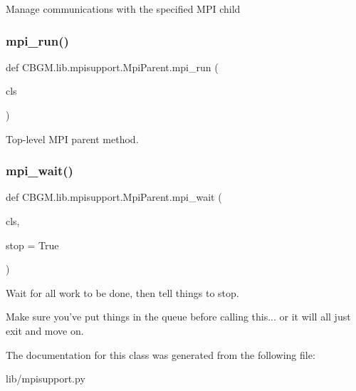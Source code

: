 \begin{DoxyVerb}Manage communications with the specified MPI child
\end{DoxyVerb}
 \mbox{\label{classCBGM_1_1lib_1_1mpisupport_1_1MpiParent_a223e2c29909cef0f2b08c8a608cdd117}} 
\subsubsection{\texorpdfstring{mpi\+\_\+run()}{mpi\_run()}}
{\footnotesize\ttfamily def C\+B\+G\+M.\+lib.\+mpisupport.\+Mpi\+Parent.\+mpi\+\_\+run (\begin{DoxyParamCaption}\item[{}]{cls }\end{DoxyParamCaption})}

\begin{DoxyVerb}Top-level MPI parent method.
\end{DoxyVerb}
 \mbox{\label{classCBGM_1_1lib_1_1mpisupport_1_1MpiParent_ab70a1d7a4775e8b451f9c1797fc6c8c2}} 
\subsubsection{\texorpdfstring{mpi\+\_\+wait()}{mpi\_wait()}}
{\footnotesize\ttfamily def C\+B\+G\+M.\+lib.\+mpisupport.\+Mpi\+Parent.\+mpi\+\_\+wait (\begin{DoxyParamCaption}\item[{}]{cls,  }\item[{}]{stop = {\ttfamily True} }\end{DoxyParamCaption})}

\begin{DoxyVerb}Wait for all work to be done, then tell things to stop.

Make sure you've put things in the queue before calling this... or
it will all just exit and move on.
\end{DoxyVerb}
 

The documentation for this class was generated from the following file\+:\begin{DoxyCompactItemize}
\item 
lib/mpisupport.\+py\end{DoxyCompactItemize}
